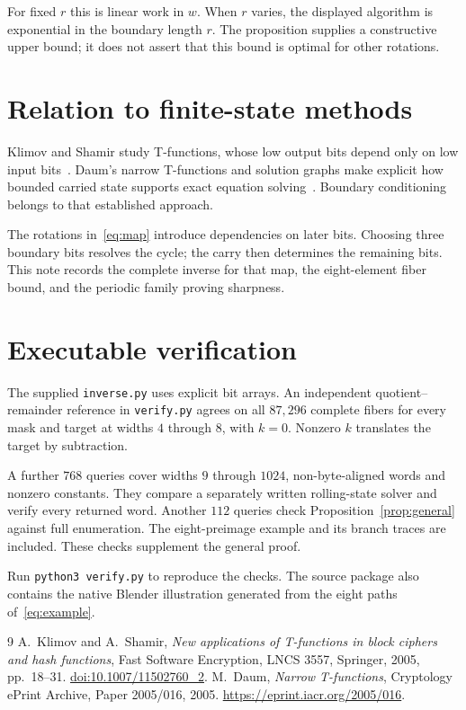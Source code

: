 \documentclass[11pt,a4paper]{article}
\begin{document}
For fixed $r$ this is linear work in $w$. When $r$ varies, the displayed algorithm is exponential in the boundary length $r$. The proposition supplies a constructive upper bound; it does not assert that this bound is optimal for other rotations.

\section{Relation to finite-state methods}
Klimov and Shamir study T-functions, whose low output bits depend only on low input bits~\cite{klimovshamir}. Daum's narrow T-functions and solution graphs make explicit how bounded carried state supports exact equation solving~\cite{daum}. Boundary conditioning belongs to that established approach.

The rotations in~\eqref{eq:map} introduce dependencies on later bits. Choosing three boundary bits resolves the cycle; the carry then determines the remaining bits. This note records the complete inverse for that map, the eight-element fiber bound, and the periodic family proving sharpness.

\section{Executable verification}
The supplied \texttt{inverse.py} uses explicit bit arrays. An independent quotient--remainder reference in \texttt{verify.py} agrees on all $87{,}296$ complete fibers for every mask and target at widths $4$ through $8$, with $k=0$. Nonzero $k$ translates the target by subtraction.

A further $768$ queries cover widths $9$ through $1024$, non-byte-aligned words and nonzero constants. They compare a separately written rolling-state solver and verify every returned word. Another $112$ queries check Proposition~\ref{prop:general} against full enumeration. The eight-preimage example and its branch traces are included. These checks supplement the general proof.

Run \texttt{python3 verify.py} to reproduce the checks. The source package also contains the native Blender illustration generated from the eight paths of~\eqref{eq:example}.

\begin{thebibliography}{9}
A.~Klimov and A.~Shamir,
\emph{New applications of T-functions in block ciphers and hash functions},
Fast Software Encryption, LNCS 3557, Springer, 2005, pp.~18--31.
\href{https://doi.org/10.1007/11502760_2}{doi:10.1007/11502760\_2}.
M.~Daum,
\emph{Narrow T-functions},
Cryptology ePrint Archive, Paper 2005/016, 2005.
\url{https://eprint.iacr.org/2005/016}.
\end{thebibliography}
\end{document}
